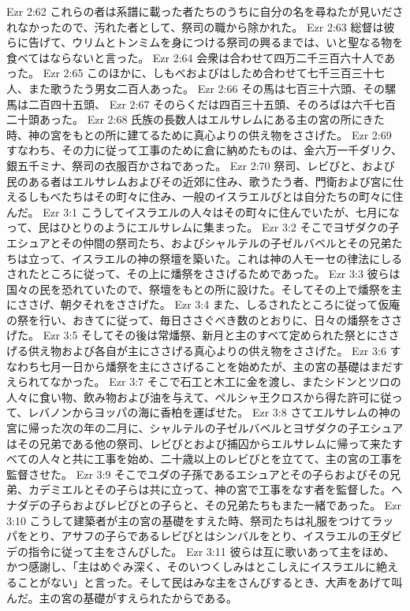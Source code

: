 Ezr 2:62  これらの者は系譜に載った者たちのうちに自分の名を尋ねたが見いだされなかったので、汚れた者として、祭司の職から除かれた。
Ezr 2:63  総督は彼らに告げて、ウリムとトンミムを身につける祭司の興るまでは、いと聖なる物を食べてはならないと言った。
Ezr 2:64  会衆は合わせて四万二千三百六十人であった。
Ezr 2:65  このほかに、しもべおよびはしため合わせて七千三百三十七人、また歌うたう男女二百人あった。
Ezr 2:66  その馬は七百三十六頭、その騾馬は二百四十五頭、
Ezr 2:67  そのらくだは四百三十五頭、そのろばは六千七百二十頭あった。
Ezr 2:68  氏族の長数人はエルサレムにある主の宮の所にきた時、神の宮をもとの所に建てるために真心よりの供え物をささげた。
Ezr 2:69  すなわち、その力に従って工事のために倉に納めたものは、金六万一千ダリク、銀五千ミナ、祭司の衣服百かさねであった。
Ezr 2:70  祭司、レビびと、および民のある者はエルサレムおよびその近郊に住み、歌うたう者、門衛および宮に仕えるしもべたちはその町々に住み、一般のイスラエルびとは自分たちの町々に住んだ。
Ezr 3:1  こうしてイスラエルの人々はその町々に住んでいたが、七月になって、民はひとりのようにエルサレムに集まった。
Ezr 3:2  そこでヨザダクの子エシュアとその仲間の祭司たち、およびシャルテルの子ゼルバベルとその兄弟たちは立って、イスラエルの神の祭壇を築いた。これは神の人モーセの律法にしるされたところに従って、その上に燔祭をささげるためであった。
Ezr 3:3  彼らは国々の民を恐れていたので、祭壇をもとの所に設けた。そしてその上で燔祭を主にささげ、朝夕それをささげた。
Ezr 3:4  また、しるされたところに従って仮庵の祭を行い、おきてに従って、毎日ささぐべき数のとおりに、日々の燔祭をささげた。
Ezr 3:5  そしてその後は常燔祭、新月と主のすべて定められた祭とにささげる供え物および各自が主にささげる真心よりの供え物をささげた。
Ezr 3:6  すなわち七月一日から燔祭を主にささげることを始めたが、主の宮の基礎はまだすえられてなかった。
Ezr 3:7  そこで石工と木工に金を渡し、またシドンとツロの人々に食い物、飲み物および油を与えて、ペルシャ王クロスから得た許可に従って、レバノンからヨッパの海に香柏を運ばせた。
Ezr 3:8  さてエルサレムの神の宮に帰った次の年の二月に、シャルテルの子ゼルバベルとヨザダクの子エシュアはその兄弟である他の祭司、レビびとおよび捕囚からエルサレムに帰って来たすべての人々と共に工事を始め、二十歳以上のレビびとを立てて、主の宮の工事を監督させた。
Ezr 3:9  そこでユダの子孫であるエシュアとその子らおよびその兄弟、カデミエルとその子らは共に立って、神の宮で工事をなす者を監督した。ヘナダデの子らおよびレビびとの子らと、その兄弟たちもまた一緒であった。
Ezr 3:10  こうして建築者が主の宮の基礎をすえた時、祭司たちは礼服をつけてラッパをとり、アサフの子らであるレビびとはシンバルをとり、イスラエルの王ダビデの指令に従って主をさんびした。
Ezr 3:11  彼らは互に歌いあって主をほめ、かつ感謝し、「主はめぐみ深く、そのいつくしみはとこしえにイスラエルに絶えることがない」と言った。そして民はみな主をさんびするとき、大声をあげて叫んだ。主の宮の基礎がすえられたからである。
